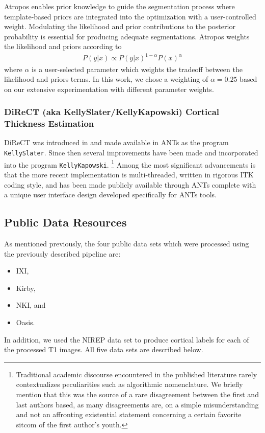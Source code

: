 Atropos enables prior knowledge to guide the
segmentation process where template-based priors are integrated into the optimization
with a user-controlled weight.  Modulating the likelihood and prior contributions
to the posterior probability is essential for producing adequate segmentations.
Atropos weights the likelihood and priors according to
\begin{align}
P(y|x) \propto P(y|x)^{1-\alpha}P(x)^{\alpha}
\end{align}
where $\alpha$ is a user-selected parameter which weights the tradeoff between the likelihood and priors terms.
In this work, we chose a weighting of $\alpha = 0.25$ 
based on our extensive experimentation with different parameter weights.


\subsubsection{DiReCT (aka KellySlater/KellyKapowski) Cortical Thickness Estimation}

DiReCT was introduced 
in \cite{das2009} and made available in ANTs as the program \verb#KellySlater#.
Since then several improvements have been made and incorporated into the program
\verb#KellyKapowski#.%
\footnote{
Traditional academic discourse encountered in the published literature
rarely contextualizes peculiarities such as algorithmic nomenclature.
We briefly mention that
this was the source of a rare disagreement between the first and last authors
based, as many disagreements are, on a simple misunderstanding and not an
affronting existential statement concerning a certain favorite sitcom
of the first author's youth. 
}
Among the most significant advancements is that the more recent
implementation is multi-threaded, written in rigorous ITK coding style, and 
has been made publicly available through  ANTs complete with a unique user 
interface design developed specifically for ANTs tools.  

\subsection{Public Data Resources}

As mentioned previously, the four public data sets which were processed
using the previously described pipeline are:
\begin{itemize}
  \item IXI,
  \item Kirby,
  \item NKI, and
  \item Oasis.
\end{itemize}
In addition, we used the NIREP data set to produce cortical labels for 
each of the processed T1 images.  All five data sets are described below.

